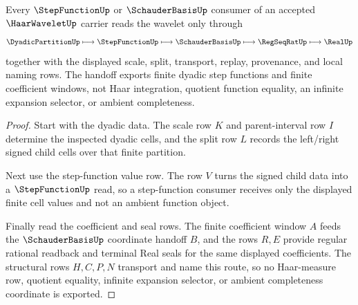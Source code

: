 \begin{theorem}
\label{thm:haar-wavelet-dyadic-step-handoff}
Every $\StepFunctionUp$ or $\SchauderBasisUp$ consumer of an accepted $\HaarWaveletUp$ carrier reads the wavelet only through
$$
\DyadicPartitionUp \longmapsto \StepFunctionUp \longmapsto \SchauderBasisUp \longmapsto \RegSeqRatUp \longmapsto \RealUp
$$
together with the displayed scale, split, transport, replay, provenance, and local naming rows. The handoff exports finite dyadic step functions and finite coefficient windows, not Haar integration, quotient function equality, an infinite expansion selector, or ambient completeness.
\end{theorem}
\begin{proof}
Start with the dyadic data. The scale row $K$ and parent-interval row $I$ determine the inspected dyadic cells, and the split row $L$ records the left/right signed child cells over that finite partition.

Next use the step-function value row. The row $V$ turns the signed child data into a $\StepFunctionUp$ read, so a step-function consumer receives only the displayed finite cell values and not an ambient function object.

Finally read the coefficient and seal rows. The finite coefficient window $A$ feeds the $\SchauderBasisUp$ coordinate handoff $B$, and the rows $R,E$ provide regular rational readback and terminal Real seals for the same displayed coefficients. The structural rows $H,C,P,N$ transport and name this route, so no Haar-measure row, quotient equality, infinite expansion selector, or ambient completeness coordinate is exported.
\end{proof}




